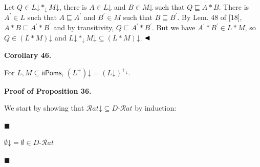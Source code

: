  
 
Let $Q\in L\mathord{\downarrow}*_{\mathord{\downarrow}}M\mathord{\downarrow}$, there is $A\in L\mathord{\downarrow}$ and $B\in M\mathord{\downarrow}$ such that $Q\sqsubseteq A*B$. There is $A^{\prime}\in L$ such that $A\sqsubseteq A^{\prime}$ and $B^{\prime}\in M$ such that $B\sqsubseteq B^{\prime}$. By Lem. 48 of [18], $A*B\sqsubseteq A^{\prime}*B^{\prime}$ and by transitivity, $Q\sqsubseteq A^{\prime}*B^{\prime}$. But we have $A^{\prime}*B^{\prime}\in L*M$, so $Q\in(L*M)\mathord{\downarrow}$ and $L\mathord{\downarrow}*_{\mathord{\downarrow}}M\mathord{\downarrow}\subseteq(L*M)\mathord{\downarrow}$. $\hfill\blacktriangleleft$\par
 
 
 
\par\medskip\noindent\textbf{Corollary 46.}\par
 
 
For $L,M\subseteq\mathsf{iiPoms}$, $(L^{+})\mathord{\downarrow}=(L\mathord{\downarrow})^{+_{\mathord{\downarrow}}}$.\par
 
 
 
 
 
\par\medskip\noindent\textbf{Proof of Proposition 36.}\par
 
 
We start by showing that $\mathcal{R}at\mathord{\downarrow}\subseteq D\text{-}\mathcal{R}at$ by induction:\par
  
\par\noindent  $\blacksquare$ 
 
$\emptyset\mathord{\downarrow}=\emptyset\in D\text{-}\mathcal{R}at$\par
 
 
 
\par\noindent  $\blacksquare$ 
 
